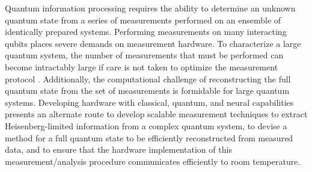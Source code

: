Quantum information processing requires the ability to determine an unknown quantum state from a series of measurements performed on an ensemble of identically prepared systems. Performing measurements on many interacting qubits places severe demands on measurement hardware. To characterize a large quantum system, the number of measurements that must be performed can become intractably large if care is not taken to optimize the measurement protocol \cite{grco2016,stpo2016}. Additionally, the computational challenge of reconstructing the full quantum state from the set of measurements is formidable for large quantum systems. Developing hardware with classical, quantum, and neural capabilities presents an alternate route to develop scalable measurement techniques to extract Heisenberg-limited information \cite{clde2010} from a complex quantum system, to devise a method for a full quantum state to be efficiently reconstructed from measured data, and to ensure that the hardware implementation of this measurement/analysis procedure communicates efficiently to room temperature. 

